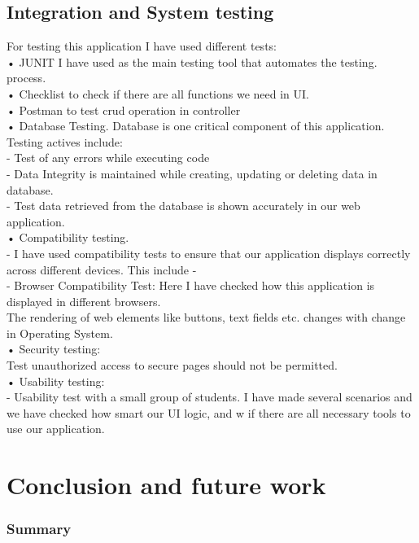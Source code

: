 \documentclass{scrartcl}
\begin{document}
\subsection{Integration and System testing}
For testing  this application I have used different tests:\\
• JUNIT I have used as the main testing tool that automates the testing.\\ process.\\
• Checklist to check if  there are all functions we need in UI.\\
• Postman to test crud operation in controller\\
• Database Testing. Database is one critical component of this application. Testing actives include:\\
 - Test of any errors while executing code\\
 - Data Integrity is maintained while creating, updating or deleting data in database.\\
 - Test data retrieved from the database is shown accurately in our web application.\\
• Compatibility testing.\\
 - I have used compatibility tests to ensure that our application displays correctly across different devices. This include -\\
 - Browser Compatibility Test: Here I have checked how this application is displayed in different browsers.\\
   The rendering of web elements like buttons, text fields etc. changes with change in Operating System.\\
• Security testing: \\
   Test unauthorized access to secure pages should not be permitted.\\
• Usability testing:\\
  -  Usability test with a small group of students. I have made several scenarios and we have checked how smart our UI logic, and w if there are all necessary tools to use our application.\\



\section{Conclusion and future work}
   \subsubsection{Summary}
\end{document}
